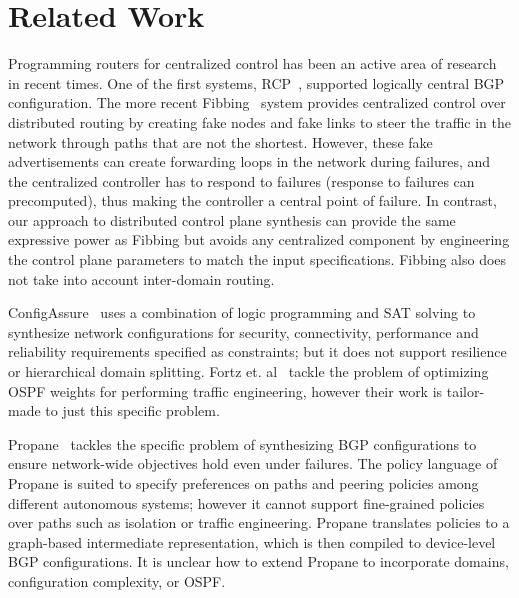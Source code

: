 \section{Related Work}\label{sec:related}
 Programming routers for centralized
control has been an active area of research in recent times. One of
the first systems, RCP~\cite{rcp}, supported logically central BGP
configuration. The more recent Fibbing~\cite{fibbing} system provides
centralized control over distributed routing by creating fake nodes
and fake links to steer the traffic in the network through paths that
are not the shortest. However, these fake advertisements can create
forwarding loops in the network during failures, and the centralized
controller has to respond to failures (response to failures can
precomputed), thus making the controller a central point of
failure. In contrast, our approach to distributed control plane
synthesis can provide the same expressive power as Fibbing but avoids
any centralized component by engineering the control plane parameters
to match the input specifications.  Fibbing also does not take into
account inter-domain routing.

 ConfigAssure~\cite{configassure}
uses a combination of logic programming and SAT solving to synthesize
network configurations for security, connectivity, performance and
reliability requirements specified as constraints; but it does not
support resilience or hierarchical domain splitting.  Fortz
et. al~\cite{ospf-te} tackle the problem of optimizing OSPF weights
for performing traffic engineering, however their work is tailor-made
to just this specific problem.

Propane~\cite{propane} tackles the specific problem of synthesizing
BGP configurations to ensure network-wide objectives hold even under
failures. The policy language of Propane is suited to specify
preferences on paths and peering policies among different autonomous
systems; however it cannot support fine-grained policies over paths
such as isolation or traffic engineering. Propane translates policies
to a graph-based intermediate representation, which is then compiled
to device-level BGP configurations. It is unclear how to extend
Propane to incorporate domains, configuration complexity, or OSPF.

